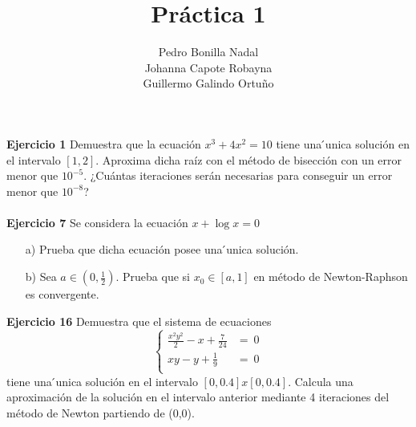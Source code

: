 \documentclass[11pt]{article}
\title{\textbf{Práctica 1}}
\author{Pedro Bonilla Nadal\\
		Johanna Capote Robayna\\
		Guillermo Galindo Ortuño}
\date{}
\begin{document}
\maketitle

\textbf{Ejercicio 1}
Demuestra que la ecuaci\'on $x^3 + 4x^2 = 10 $ tiene una  ́unica soluci\'on en el intervalo $ [1,2] $. Aproxima dicha ra\'iz con el m\'etodo de bisecci\'on con un error menor que $10^{-5}$. ¿Cu\'antas iteraciones ser\'an necesarias para conseguir un error menor que $10^{-8}$?
\\
\\
\textbf{Ejercicio 7}
Se considera la ecuaci\'on $x + \log x = 0$
\begin{itemize}

\item[a)]Prueba que dicha ecuaci\'on posee una ́unica soluci\'on.
\item[b)] Sea $a \in (0, \frac{1}{2})$. Prueba que  si $x_0 \in [a,1]$ en m\'etodo de Newton-Raphson es convergente.

\end{itemize}
\textbf{Ejercicio 16}
Demuestra que el sistema de ecuaciones
$$\begin{cases}
\frac{x^2y^2}{2} - x + \frac{7}{24} &= \ 0 \\
xy - y + \frac{1}{9} &= \ 0\\
\end{cases}$$
tiene una  ́unica soluci\'on en el intervalo $[0, 0.4]x[0, 0.4]$. Calcula una aproximaci\'on de la soluci\'on en el intervalo anterior mediante 4 iteraciones del m\'etodo de Newton partiendo de (0,0).
\end{document}
